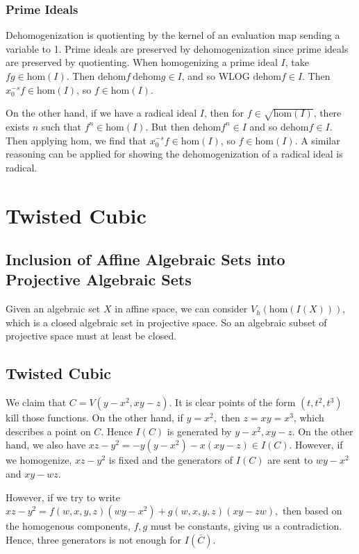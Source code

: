\documentclass[11pt]{amsart}
\theoremstyle{named}
\renewcommand{\hom}[1]{\mathrm{hom}(#1)}
\newcommand{\dehom}{\mathrm{dehom}}
\begin{document}
\subsubsection{Prime Ideals} Dehomogenization is quotienting by the kernel of an evaluation map sending a variable to 1. Prime ideals are preserved by dehomogenization since prime ideals are preserved by quotienting. When homogenizing a prime ideal $I$, take $fg \in \hom{I}$. Then $\dehom f \ \dehom g \in I$, and so WLOG $\dehom f \in I$. Then $x_0^{-s} f \in \hom I$, so $f \in \hom I$.

On the other hand, if we have a radical ideal $I$, then for $f \in \sqrt{\hom I}$, there exists $n$ such that $f^n \in \hom I$. But then $\dehom{f}^n \in I$ and so $\dehom f \in I$. Then applying $\mathrm{hom}$, we find that $x_0^{-s} f \in \hom I$, so $f \in \hom I.$ A similar reasoning can be applied for showing the dehomogenization of a radical ideal is radical.

\section{Twisted Cubic}
\subsection{Inclusion of Affine Algebraic Sets into Projective Algebraic Sets} Given an algebraic set $X$ in affine space, we can consider $V_h(\hom {I(X)})$, which is a closed algebraic set in projective space. So an algebraic subset of projective space must at least be closed.

\subsection{Twisted Cubic}
We claim that $C = V(y - x^2, xy - z)$. It is clear points of the form $(t, t^2, t^3)$ kill those functions. On the other hand, if $y = x^2,$ then $z = xy = x^3$, which describes a point on $C$. Hence $I(C)$ is generated by $y - x^2, xy - z$. On the other hand, we also have $xz - y^2 = -y(y - x^2) - x(xy - z) \in I(C)$. However, if we homogenize, $xz - y^2$ is fixed and the generators of $I(C)$ are sent to $wy - x^2$ and $xy - wz$.

However, if we try to write $xz - y^2 = f(w,x,y,z) (wy - x^2) + g(w,x,y,z)(xy - zw),$ then based on the homogenous components, $f, g$ must be constants, giving us a contradiction. Hence, three generators is not enough for $I(\bar{C}).$
\end{document}
